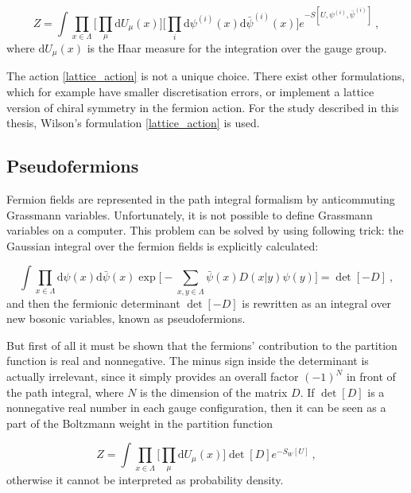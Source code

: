 \begin{equation}
Z = \int  \prod_{x \in \Lambda} \biggr[ \prod_{\mu} \mathrm{d} U_{\mu}(x) \biggr] \biggl[ \prod_i \mathrm{d} \psi^{(i)}(x) \mathrm{d} \bar \psi^{(i)}(x) \biggr] e^{-S[U,\psi^{(i)}, \bar\psi^{(i)}]} \: ,
\label{partition_function}
\end{equation}
%
where $\mathrm{d} U_{\mu}(x)$ is the Haar measure for the integration over the gauge group.

The action \ref{lattice_action} is not  a unique choice. There exist other formulations, which for example have smaller discretisation errors, or implement a lattice version of chiral symmetry in the fermion action. For the study described in this thesis, Wilson's formulation \ref{lattice_action} is used.



\subsection{Pseudofermions}

Fermion fields are represented in the path integral formalism by anticommuting Grassmann variables. Unfortunately, it is not possible to define Grassmann variables on a computer. This problem can be solved by using following trick: the Gaussian integral over the fermion fields is explicitly calculated:

\begin{equation}
\int \prod_{x \in \Lambda}  \mathrm{d} \psi(x) \mathrm{d} \bar \psi(x) \exp \biggl[-\sum_{x,y \in \Lambda} \bar\psi(x) D(x \vert y)\psi(y) \biggr] = \det[-D] \: ,
\end{equation}
%
and then the fermionic determinant $\det[-D]$ is rewritten as an integral over new bosonic variables, known as pseudofermions. 

But first of all it must be shown that the fermions' contribution to the partition function is real and nonnegative.
The minus sign inside the determinant is actually irrelevant, since it simply provides an overall factor $(-1)^N$ in front of the path integral, where $N$ is the dimension of the matrix $D$. If $\det[D]$ is a nonnegative real number in each gauge configuration, then it can  be seen as a part of the Boltzmann weight in the partition function

\begin{equation}
Z = \int \prod_{x \in \Lambda} \biggl[ \prod_{\mu} \mathrm{d} U_{\mu}(x) \biggr] \det[D] e^{-S_W[U]} \: ,
\end{equation}
%
otherwise it cannot be interpreted as probability density. 

